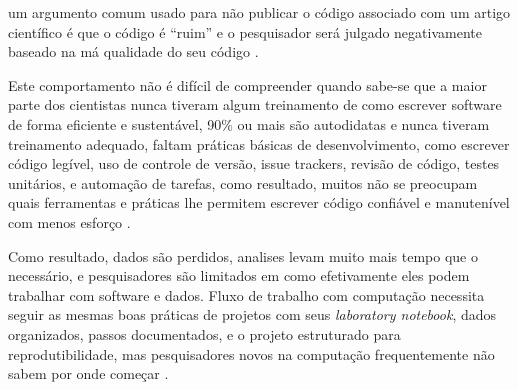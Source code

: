 
um argumento comum usado para não publicar o
código associado com um artigo científico é que o código é ``ruim'' e o
pesquisador será julgado negativamente baseado na má qualidade do seu código
\cite{allen2017engineering}.


Este comportamento não é difícil de compreender quando sabe-se que a maior
parte dos cientistas nunca tiveram algum treinamento de como escrever software
de forma eficiente e sustentável, 90\% ou mais são autodidatas e nunca tiveram
treinamento adequado, faltam práticas básicas de desenvolvimento, como escrever
código legível, uso de controle de versão, issue trackers, revisão de código,
testes unitários, e automação de tarefas, como resultado, muitos não se
preocupam quais ferramentas e práticas lhe permitem escrever código confiável e
manutenível com menos esforço \cite{wilson2014best}.

Como resultado, dados são perdidos, analises levam muito mais tempo que o
necessário, e pesquisadores são limitados em como efetivamente eles podem
trabalhar com software e dados.  Fluxo de trabalho com computação necessita
seguir as mesmas boas práticas de projetos com seus {\it laboratory notebook},
dados organizados, passos documentados, e o projeto estruturado para
reprodutibilidade, mas pesquisadores novos na computação frequentemente não
sabem por onde começar \cite{wilson2017good}.


